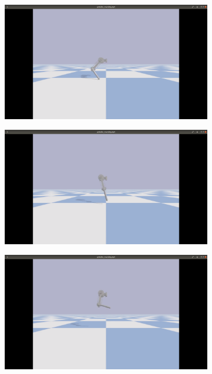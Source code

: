 \documentclass[onecolumn, letter paper]{report}
\begin{document}
\begin{figure}[htb!]
    \centering
    \begin{subfigure}{.16\textwidth}
    \includegraphics[width=\textwidth, trim={27cm 10cm 28cm 5cm}, clip]{figures/simBackflip/sb1.png}
    \end{subfigure}
    \begin{subfigure}{.16\textwidth}
    \includegraphics[width=\textwidth, trim={27cm 10cm 28cm 5cm}, clip]{figures/simBackflip/sb2.png}
    \end{subfigure}
    \begin{subfigure}{.16\textwidth}
    \includegraphics[width=\textwidth, trim={27cm 10cm 28cm 5cm}, clip]{figures/simBackflip/sb3.png}

\end{subfigure}
\end{figure}
\end{document}
